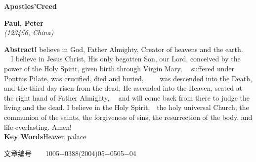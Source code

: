 \documentclass[a4paper,11pt,onecolumn,twoside]{ctexart}
\begin{document}
\vspace{.1cm}
\begin{center}
\parbox{\textwidth}{{\large{\textbf{Apostles'Creed}}}\\
\vspace{-0.5cm}
\begin{center}
\textbf{Paul, Peter}\\[2pt]
\small{\textit{(123456, China)}}\\[2pt]
\end{center}
{\small{\textbf{Abstract}\quad I believe in God, Father Almighty, Creator of heavens and the earth. 　I believe in Jesus Christ, His only begotten Son, our Lord, conceived by the power of the Holy Spirit, given birth through Virgin Mary, 　suffered under Pontius Pilate, was crucified, died and buried, 　　was descended into the Death, and the third day risen from the dead; He ascended into the Heaven, seated at the right hand of Father Almighty, 　and will come back from there to judge the living and the dead. I believe in the Holy Spirit,　the holy universal Church, the communion of the saints, the forgiveness of sins, the resurrection of the body, and life everlasting. Amen!\\
\textbf{Key Words}\quad Heaven palace}}
}
\end{center}
\begin{minipage}[c]{10cm}
\vspace{-35.5cm}
文章编号~~~~1005$-$0388(2004)05$-$0505$-$04
\end{minipage}
\setlength{\oddsidemargin}{-.5cm}  %
\setlength{\evensidemargin}{\oddsidemargin}
\setlength{\textwidth}{17.00cm}
\end{document}
